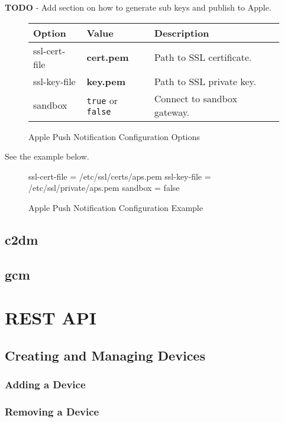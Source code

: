 \documentclass[12pt]{article}
\newcommand{\file}[1]{{\bf\ttfamily #1}}
\begin{document}
\textbf{TODO} - Add section on how to generate sub keys and publish to Apple.

\begin{figure}[h!]
\centering
\begin{tabular}{l l l}
\hline
Option & Value & Description \\
\hline
ssl-cert-file & \file{cert.pem} & Path to SSL certificate. \\
ssl-key-file & \file{key.pem} & Path to SSL private key. \\
sandbox & \verb|true| or \verb|false| & Connect to sandbox gateway. \\
\hline
\end{tabular}
\caption{Apple Push Notification Configuration Options}
\end{figure}

See the example below.

\begin{figure}[h!]
\begin{Terminal}
[aps]
ssl-cert-file = /etc/ssl/certs/aps.pem
ssl-key-file = /etc/ssl/private/aps.pem
sandbox = false
\end{Terminal}
\caption{Apple Push Notification Configuration Example}
\end{figure}

\subsection{c2dm}

\subsection{gcm}

\section{REST API}

\subsection{Creating and Managing Devices}

\subsubsection{Adding a Device}

\subsubsection{Removing a Device}
\end{document}
